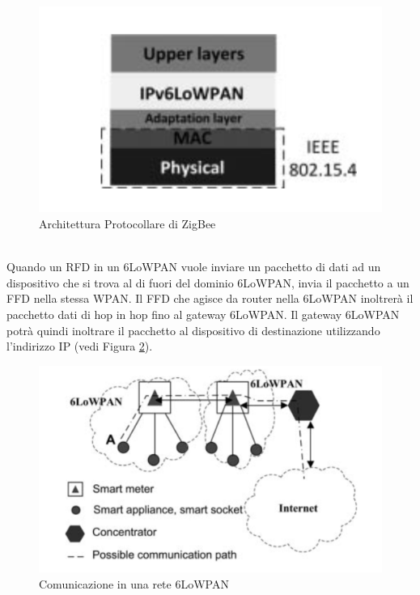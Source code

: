 \begin{figure}[h]
	\centering
	\includegraphics[scale=0.350]{imgs/6pan.png}
	\caption{Architettura Protocollare di ZigBee} \label{fig:6pan}
\end{figure}
\\
Quando un RFD in un 6LoWPAN vuole inviare un pacchetto di dati ad un dispositivo che si trova al di fuori del dominio 6LoWPAN, invia il pacchetto a un FFD nella stessa WPAN. Il FFD che agisce da router nella 6LoWPAN inoltrerà il pacchetto dati di hop in hop fino al gateway 6LoWPAN. Il gateway 6LoWPAN potrà quindi inoltrare il pacchetto al dispositivo di destinazione utilizzando l'indirizzo IP (vedi Figura \ref{fig:6pancom}).
\begin{figure}[h]
	\centering
	\includegraphics[scale=0.350]{imgs/6pancom.png}
	\caption{Comunicazione in una rete 6LoWPAN} \label{fig:6pancom}
\end{figure}
